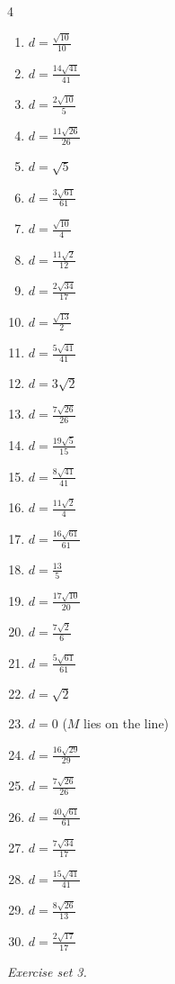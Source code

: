 \begin{multicols}{4}\raggedright
\begin{enumerate}[label=\arabic*., leftmargin=*, itemsep=1pt]
\item $d=\frac{\sqrt{10}}{10}$
\item $d=\frac{14 \sqrt{41}}{41}$
\item $d=\frac{2 \sqrt{10}}{5}$
\item $d=\frac{11 \sqrt{26}}{26}$
\item $d=\sqrt{5}$
\item $d=\frac{3 \sqrt{61}}{61}$
\item $d=\frac{\sqrt{10}}{4}$
\item $d=\frac{11 \sqrt{2}}{12}$
\item $d=\frac{2 \sqrt{34}}{17}$
\item $d=\frac{\sqrt{13}}{2}$
\item $d=\frac{5 \sqrt{41}}{41}$
\item $d=3 \sqrt{2}$
\item $d=\frac{7 \sqrt{26}}{26}$
\item $d=\frac{19 \sqrt{5}}{15}$
\item $d=\frac{8 \sqrt{41}}{41}$
\item $d=\frac{11 \sqrt{2}}{4}$
\item $d=\frac{16 \sqrt{61}}{61}$
\item $d=\frac{13}{5}$
\item $d=\frac{17 \sqrt{10}}{20}$
\item $d=\frac{7 \sqrt{2}}{6}$
\item $d=\frac{5 \sqrt{61}}{61}$
\item $d=\sqrt{2}$
\item $d=0$ ($M$ lies on the line)
\item $d=\frac{16 \sqrt{29}}{29}$
\item $d=\frac{7 \sqrt{26}}{26}$
\item $d=\frac{40 \sqrt{61}}{61}$
\item $d=\frac{7 \sqrt{34}}{17}$
\item $d=\frac{15 \sqrt{41}}{41}$
\item $d=\frac{8 \sqrt{26}}{13}$
\item $d=\frac{2 \sqrt{17}}{17}$
\end{enumerate}
\end{multicols}
\par\noindent\emph{Exercise set 3.}\nopagebreak
